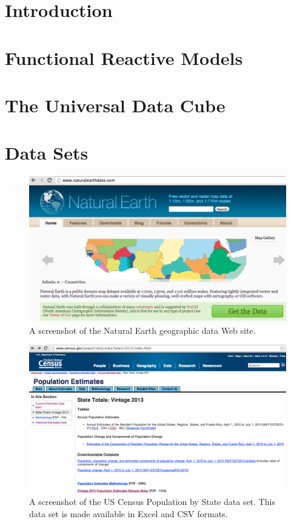 \documentclass[12pt]{report}
\begin{document}
\begin{doublespace}

\chapter{Introduction}

\pagebreak
\chapter{Functional Reactive Models}

\pagebreak
\chapter{The Universal Data Cube}
\chapter{Data Sets}
\begin{figure}[h]
  \caption{A screenshot of the Natural Earth geographic data Web site.}
  \centering
  \includegraphics[width=\textwidth]{figures/naturalEarth.png}
\end{figure}
\begin{figure}[h]
  \caption{A screenshot of the US Census Population by State data set. This data set is made available in Excel and CSV formats.}
  \centering
  \includegraphics[width=\textwidth]{figures/usCensusPopulationByState.png}
\end{figure}

\end{doublespace}
\end{document}
